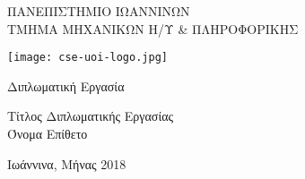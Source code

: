 \begin{titlepage}
    \begin{center}

	\vspace*{0.3cm}
	{\Large
	ΠΑΝΕΠΙΣΤΗΜΙΟ ΙΩΑΝΝΙΝΩΝ\\
	\vspace{0.4cm}
	ΤΜΗΜΑ ΜΗΧΑΝΙΚΩΝ Η/Υ \& ΠΛΗΡΟΦΟΡΙΚΗΣ}

	\vspace{2.5cm}
	\texttt{[image: cse-uoi-logo.jpg]}
	\vspace{2cm}
	
	{\Large Διπλωματική Εργασία }
        
	\vspace{2cm}
       
	{\Large Τίτλος Διπλωματικής Εργασίας  \\
       \vspace{2cm}
	Όνομα Επίθετο }


      
      \vspace{1cm}
	{\Large 
	Ιωάννινα, Μήνας 2018 
	}

    \end{center}
\end{titlepage}
